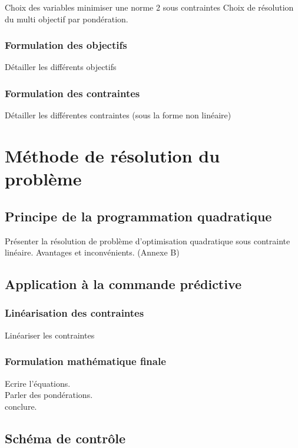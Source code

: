 Choix des variables
minimiser une norme 2 sous contraintes
Choix de résolution du multi objectif par pondération.

\subsubsection{Formulation des objectifs}

Détailler les différents objectifs

\subsubsection{Formulation des contraintes}

Détailler les différentes contraintes (sous la forme non linéaire)

\section{Méthode de résolution du problème}
\subsection{Principe de la programmation quadratique}

Présenter la résolution de problème d'optimisation quadratique sous contrainte linéaire.
Avantages et inconvénients.
(Annexe B)

\subsection{Application à la commande prédictive}
\subsubsection{Linéarisation des contraintes}

Linéariser les contraintes

\subsubsection{Formulation mathématique finale}

Ecrire l'équations.\\
Parler des pondérations.\\
conclure.

\subsection{Schéma de contrôle}

